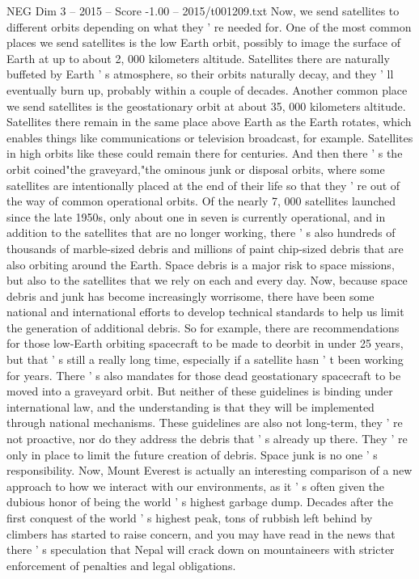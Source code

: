 \begin{textsample}{NEG Dim 3 – 2015 – Score -1.00 – 2015/t001209.txt}
Now, we send satellites to different orbits depending on what they ' re needed for.
One of the most common places we send satellites is the low Earth orbit, possibly to image the surface of Earth at up to about 2, 000 kilometers altitude.
Satellites there are naturally buffeted by Earth ' s atmosphere, so their orbits naturally decay, and they ' ll eventually burn up, probably within a couple of decades.
Another common place we send satellites is the geostationary orbit at about 35, 000 kilometers altitude.
Satellites there remain in the same place above Earth as the Earth rotates, which enables things like communications or television broadcast, for example.
Satellites in high orbits like these could remain there for centuries.
And then there ' s the orbit coined"the graveyard,"the ominous junk or disposal orbits, where some satellites are intentionally placed at the end of their life so that they ' re out of the way of common operational orbits.
Of the nearly 7, 000 satellites launched since the late 1950s, only about one in seven is currently operational, and in addition to the satellites that are no longer working, there ' s also hundreds of thousands of marble-sized debris and millions of paint chip-sized debris that are also orbiting around the Earth.
Space debris is a major risk to space missions, but also to the satellites that we rely on each and every day.
Now, because space debris and junk has become increasingly worrisome, there have been some national and international efforts to develop technical standards to help us limit the generation of additional debris.
So for example, there are recommendations for those low-Earth orbiting spacecraft to be made to deorbit in under 25 years, but that ' s still a really long time, especially if a satellite hasn ' t been working for years.
There ' s also mandates for those dead geostationary spacecraft to be moved into a graveyard orbit.
But neither of these guidelines is binding under international law, and the understanding is that they will be implemented through national mechanisms.
These guidelines are also not long-term, they ' re not proactive, nor do they address the debris that ' s already up there.
They ' re only in place to limit the future creation of debris.
Space junk is no one ' s responsibility.
Now, Mount Everest is actually an interesting comparison of a new approach to how we interact with our environments, as it ' s often given the dubious honor of being the world ' s highest garbage dump.
Decades after the first conquest of the world ' s highest peak, tons of rubbish left behind by climbers has started to raise concern, and you may have read in the news that there ' s speculation that Nepal will crack down on mountaineers with stricter enforcement of penalties and legal obligations.

\end{textsample}
